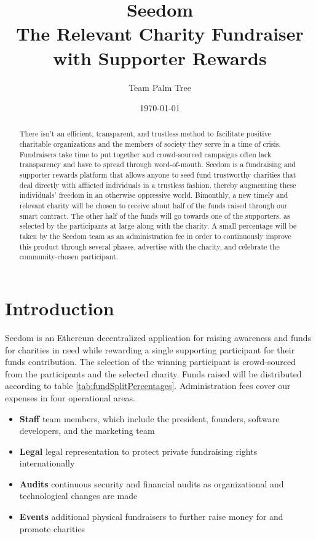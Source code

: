 \documentclass[11pt]{article}
\begin{document}
\title{%
\Huge Seedom \\[4mm]
\large The Relevant Charity Fundraiser \\[1mm]
with Supporter Rewards}
\author{Team Palm Tree}
\date{\today}
\maketitle

\begin{abstract}
There isn't an efficient, transparent, and trustless method to facilitate positive charitable organizations and the members of society they serve in a time of crisis. Fundraisers take time to put together and crowd-sourced campaigns often lack transparency and have to spread through word-of-mouth. Seedom is a fundraising and supporter rewards platform that allows anyone to seed fund trustworthy charities that deal directly with afflicted individuals in a trustless fashion, thereby augmenting these individuals' freedom in an otherwise oppressive world. Bimonthly, a new timely and relevant charity will be chosen to receive about half of the funds raised through our smart contract. The other half of the funds will go towards one of the supporters, as selected by the participants at large along with the charity. A small percentage will be taken by the Seedom team as an administration fee in order to continuously improve this product through several phases, advertise with the charity, and celebrate the community-chosen participant.
\end{abstract}
\pagebreak

\tableofcontents
\pagebreak

\section{Introduction}

Seedom is an Ethereum decentralized application for raising awareness and funds for charities in need while rewarding a single supporting participant for their funds contribution. The selection of the winning participant is crowd-sourced from the participants and the selected charity. Funds raised will be distributed according to table \ref{tab:fundSplitPercentages}. Administration fees cover our expenses in four operational areas.

\begin{itemize}
\item{\textbf{Staff} team members, which include the president, founders, software developers, and the marketing team}
\item{\textbf{Legal} legal representation to protect private fundraising rights internationally}
\item{\textbf{Audits} continuous security and financial audits as organizational and technological changes are made}
\item{\textbf{Events} additional physical fundraisers to further raise money for and promote charities}
\end{itemize}
\end{document}
